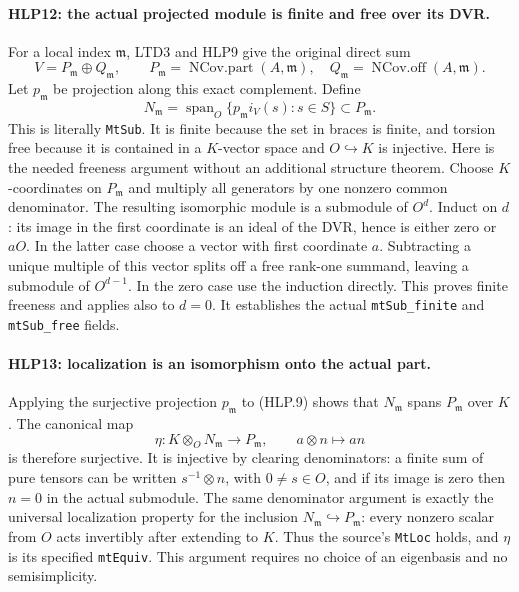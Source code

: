 \paragraph{HLP12: the actual projected module is finite and free over its DVR.}
\label{claim:HLP12}
For a local index \(\mathfrak m\), LTD3 and HLP9 give the original
direct sum
\[
 V=P_{\mathfrak m}\oplus Q_{\mathfrak m},\qquad
 P_{\mathfrak m}=\operatorname{NCov.part}(A,\mathfrak m),\quad
 Q_{\mathfrak m}=\operatorname{NCov.off}(A,\mathfrak m).
\]
Let \(p_{\mathfrak m}\) be projection along this exact complement.
Define
\[
 N_{\mathfrak m}
   =\operatorname{span}_O\{p_{\mathfrak m}i_V(s):s\in S\}
       \subset P_{\mathfrak m}.                      \tag{HLP.10}
\]
This is literally \texttt{MtSub}. It is finite because the set in
braces is finite, and torsion free because it is contained in a
\(K\)-vector space and \(O\hookrightarrow K\) is injective.
Here is the needed freeness argument without an additional
structure theorem. Choose \(K\)-coordinates on \(P_{\mathfrak m}\)
and multiply all generators by one nonzero common denominator.
The resulting isomorphic module is a submodule of \(O^d\).
Induct on \(d\): its image in the first coordinate is an ideal of
the DVR, hence is either zero or \(aO\). In the latter case choose
a vector with first coordinate \(a\). Subtracting a unique multiple
of this vector splits off a free rank-one summand, leaving a
submodule of \(O^{d-1}\). In the zero case use the induction
directly. This proves finite freeness and applies also to \(d=0\).
It establishes the actual \texttt{mtSub\_finite} and
\texttt{mtSub\_free} fields.

\paragraph{HLP13: localization is an isomorphism onto the actual part.}
\label{claim:HLP13}
Applying the surjective projection \(p_{\mathfrak m}\) to (HLP.9)
shows that \(N_{\mathfrak m}\) spans \(P_{\mathfrak m}\) over \(K\).
The canonical map
\[
 \eta:K\otimes_ON_{\mathfrak m}\longrightarrow P_{\mathfrak m},
                  \qquad a\otimes n\longmapsto an    \tag{HLP.11}
\]
is therefore surjective. It is injective by clearing denominators:
a finite sum of pure tensors can be written \(s^{-1}\otimes n\),
with \(0\ne s\in O\), and if its image is zero then \(n=0\)
in the actual submodule. The same denominator argument is exactly
the universal localization property for the inclusion
\(N_{\mathfrak m}\hookrightarrow P_{\mathfrak m}\): every
nonzero scalar from \(O\) acts invertibly after extending to \(K\).
Thus the source's \texttt{MtLoc} holds, and \(\eta\) is its
specified \texttt{mtEquiv}. This argument requires no choice of
an eigenbasis and no semisimplicity.

